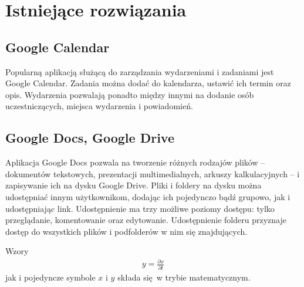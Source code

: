 \documentclass[a4paper,twoside,12pt]{book}
\newtheorem{Definition}{Definicja}
\newtheorem{Example}{Przykład}
\newtheorem{Theorem}{Twierdzenie}
\begin{document}
\section{Istniejące rozwiązania}
\subsection{Google Calendar}
Popularną aplikacją służącą do zarządzania wydarzeniami i zadaniami jest Google Calendar. Zadania można dodać do kalendarza, ustawić ich termin oraz opis. Wydarzenia pozwalają ponadto między innymi na dodanie osób uczestniczących, miejsca wydarzenia i powiadomień.
\subsection{Google Docs, Google Drive}
Aplikacja Google Docs pozwala na tworzenie różnych rodzajów plików -- dokumentów tekstowych, prezentacji multimedialnych, arkuszy kalkulacyjnych -- i zapisywanie ich na dysku Google Drive. Pliki i foldery na dysku można udostępniać innym użytkownikom, dodając ich pojedynczo bądź grupowo, jak i udostępniając link. Udostępnienie ma trzy możliwe poziomy dostępu: tylko przeglądanie, komentowanie oraz edytowanie. Udostępnienie folderu przyznaje dostęp do wszystkich plików i podfolderów w nim się znajdujących.


Wzory  
\begin{align}
y = \frac{\partial x}{\partial t}
\end{align}
jak i pojedyncze symbole $x$ i $y$  składa się w trybie matematycznym.


%
%
\end{document}
